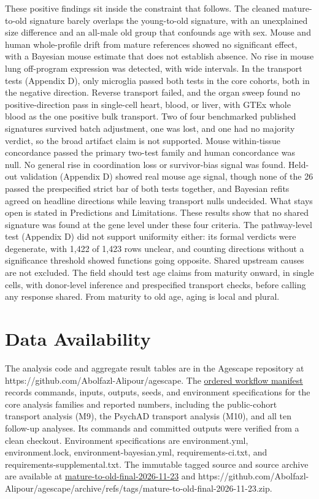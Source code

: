 \documentclass[11pt]{article}
\begin{document}
These positive findings sit inside the constraint that follows. The cleaned mature-to-old signature barely overlaps the young-to-old signature, with an unexplained size difference and an all-male old group that confounds age with sex. Mouse and human whole-profile drift from mature references showed no significant effect, with a Bayesian mouse estimate that does not establish absence. No rise in mouse lung off-program expression was detected, with wide intervals. In the transport tests (Appendix D), only microglia passed both tests in the core cohorts, both in the negative direction. Reverse transport failed, and the organ sweep found no positive-direction pass in single-cell heart, blood, or liver, with GTEx whole blood as the one positive bulk transport. Two of four benchmarked published signatures survived batch adjustment, one was lost, and one had no majority verdict, so the broad artifact claim is not supported. Mouse within-tissue concordance passed the primary two-test family and human concordance was null. No general rise in coordination loss or survivor-bias signal was found. Held-out validation (Appendix D) showed real mouse age signal, though none of the 26 passed the prespecified strict bar of both tests together, and Bayesian refits agreed on headline directions while leaving transport nulls undecided. What stays open is stated in Predictions and Limitations. These results show that no shared signature was found at the gene level under these four criteria. The pathway-level test (Appendix D) did not support uniformity either: its formal verdicts were degenerate, with 1,422 of 1,423 rows unclear, and counting directions without a significance threshold showed functions going opposite. Shared upstream causes are not excluded. The field should test age claims from maturity onward, in single cells, with donor-level inference and prespecified transport checks, before calling any response shared. From maturity to old age, aging is local and plural.


\section*{Data Availability}

The analysis code and aggregate result tables are in the Agescape repository at https://github.com/Abolfazl-Alipour/agescape. The \href{https://github.com/Abolfazl-Alipour/agescape/blob/mature-to-old-final-2026-11-23/report/plos-one/workflow-manifest.tsv}{ordered workflow manifest} records commands, inputs, outputs, seeds, and environment specifications for the core analysis families and reported numbers, including the public-cohort transport analysis (M9), the PsychAD transport analysis (M10), and all ten follow-up analyses. Its commands and committed outputs were verified from a clean checkout. Environment specifications are environment.yml, environment.lock, environment-bayesian.yml, requirements-ci.txt, and requirements-supplemental.txt. The immutable tagged source and source archive are available at \href{https://github.com/Abolfazl-Alipour/agescape/tree/mature-to-old-final-2026-11-23}{mature-to-old-final-2026-11-23} and https://github.com/Abolfazl-Alipour/agescape/archive/refs/tags/mature-to-old-final-2026-11-23.zip.
\end{document}
